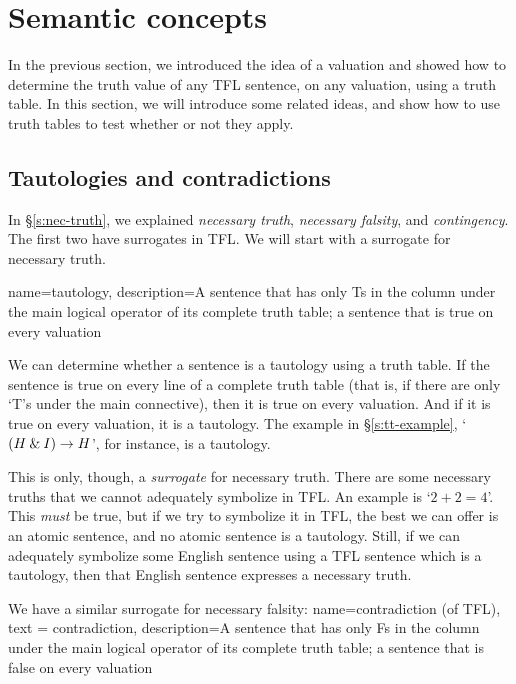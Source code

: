 \chapter{Semantic concepts}
\label{s:SemanticConcepts}

In the previous section, we introduced the idea of a valuation and showed how to determine the truth value of any TFL sentence, on any valuation, using a truth table. In this section, we will introduce some related ideas, and show how to use truth tables to test whether or not they apply.


\section{Tautologies and contradictions}
In \S\ref{s:nec-truth}, we explained \emph{necessary truth}, \emph{necessary falsity}, and \textit{contingency}. The first two have surrogates in TFL. We will start with a surrogate for necessary truth.

{
name=tautology,
description={A sentence that has only Ts in the column under the main logical operator of its \gls{complete truth table}; a sentence that is true on every \gls{valuation}}
}

We can determine whether a sentence is a tautology using a truth table. If the sentence is true on every line of a complete truth table (that is, if there are only `T's under the main connective), then it is true on every valuation. And if it is true on every valuation, it is a tautology. The example in \S\ref{s:tt-example}, `$(H \mathbin{\&} I) \rightarrow H$', for instance, is a tautology. 

This is only, though, a \emph{surrogate} for necessary truth. There are some necessary truths that we cannot adequately symbolize in TFL. An example is `$2 + 2 = 4$'. This \emph{must} be true, but if we try to symbolize it in TFL, the best we can offer is an atomic sentence, and no atomic sentence is a tautology. Still, if we can adequately symbolize some English sentence using a TFL sentence which is a tautology, then that English sentence expresses a necessary truth.

We have a similar surrogate for necessary falsity:
{
  name=contradiction (of TFL),
  text = contradiction,
description={A sentence that has only Fs in the column under the main logical operator of its \gls{complete truth table}; a sentence that is false on every \gls{valuation}}
}

